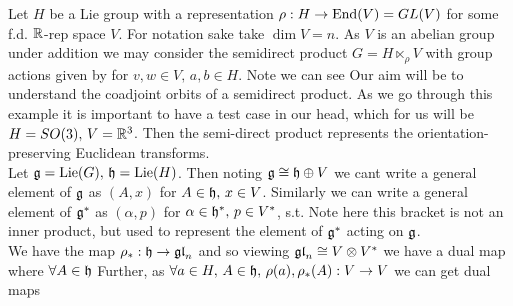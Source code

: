 \documentclass{article}
\begin{document}
Let $H$ be a Lie group with a representation $\rho:H \to \operatorname{End}(V)=GL(V)$ for some f.d. $\mathbb{R}$-rep space $V$. For notation sake take $\dim V = n$. As $V$ is an abelian group under addition we may consider the semidirect product $G =H\ltimes_\rho V$ with group actions given by 
for $v,w \in V, \, a,b \in H$. Note we can see 
Our aim will be to understand the coadjoint orbits of a semidirect product. As we go through this example it is important to have a test case in our head, which for us will be $H=SO(3), \, V = \mathbb{R}^3$. Then the semi-direct product represents the orientation-preserving Euclidean transforms. \\
Let $\mathfrak{g} = \operatorname{Lie}(G), \, \mathfrak{h} = \operatorname{Lie}(H)$. Then noting $\mathfrak{g}\cong \mathfrak{h} \oplus V$ we cant write a general element of $\mathfrak{g}$ as $(A,x)$ for $A \in \mathfrak{h}, \, x \in V$. Similarly we can write a general element of $\mathfrak{g}^\ast$ as $(\alpha,p)$ for $\alpha \in \mathfrak{h}^\ast, \, p \in V^\ast$, s.t. 
Note here this bracket is not an inner product, but used to represent the element of $\mathfrak{g}^\ast$ acting on $\mathfrak{g}$. \\
We have the map $\rho_\ast : \mathfrak{h} \to \mathfrak{gl}_n $ and so viewing $\mathfrak{gl}_n \cong V \otimes V^\ast$ we have a dual map 
where $\forall A \in \mathfrak{h}$
Further, as $\forall a \in H, \, A \in \mathfrak{h}, \, \rho(a),\rho_\ast(A):V \to V$ we can get dual maps
\end{document}
